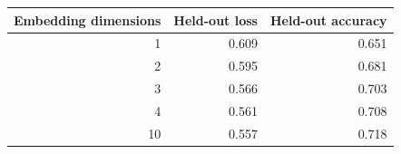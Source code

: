 \begin{tabular}{rrr}
\toprule
Embedding dimensions & Held-out loss & Held-out accuracy \\
\midrule
1 & 0.609 & 0.651 \\
2 & 0.595 & 0.681 \\
3 & 0.566 & 0.703 \\
4 & 0.561 & 0.708 \\
10 & 0.557 & 0.718 \\
\bottomrule
\end{tabular}
